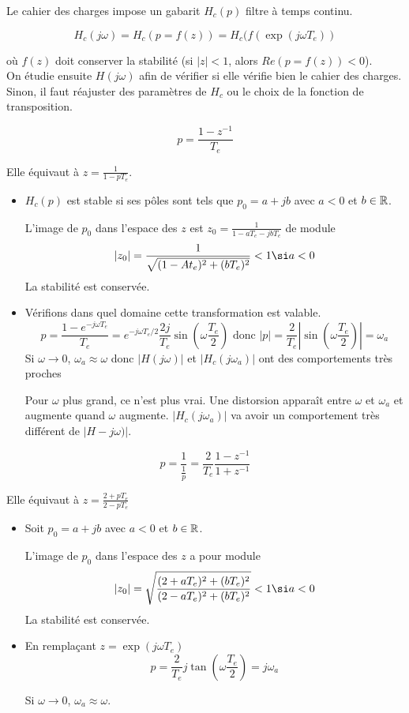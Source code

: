 \documentclass[main.tex]{subfiles}
\begin{document}
Le cahier des charges impose un gabarit $H_c(p)$ filtre à temps continu.

\[H_c(j\omega) = H_c(p=f(z)) = H_c(f(\exp(j\omega T_e))\]

où $f(z)$ doit conserver la stabilité (si $|z| < 1$, alors $Re(p=f(z))<0$).\\

On étudie ensuite $H(j\omega)$ afin de vérifier si elle vérifie bien le cahier des charges. Sinon, il faut réajuster des paramètres de $H_c$ ou le choix de la fonction de transposition.

\begin{exemple} \[p=\frac{1-z^{-1}}{T_e}\]

Elle équivaut à $z = \frac{1}{1-pT_e}$.

\begin{itemize}
\item $H_c(p)$ est stable si ses pôles sont tels que $p_0=a+jb$ avec $a<0$ et $b\in \mathbb{R}$.

L'image de $p_0$ dans l'espace des $z$ est $z_0 = \frac{1}{1-aT_e -jbT_e}$ de module \[|z_0| = \frac{1}{\sqrt{(1-At_e)^2 + (bT_e)^2}} <1 \si a < 0\] La stabilité est conservée.

\item Vérifions dans quel domaine cette transformation est valable.\[ p = \frac{1-e^{-j\omega T_e}}{T_e} = e^{-j\omega T_e/2} \frac{2j}{T_e} \sin(\omega \frac{T_e}{2}) \text{ donc } |p| = \frac{2}{T_e}|\sin(\omega \frac{T_e}{2})| = \omega_a\]
Si $\omega \to 0$, $\omega_a \approx \omega$ donc $|H(j\omega)|$ et $|H_c(j\omega_a)|$ ont des comportements très proches

Pour $\omega$ plus grand, ce n'est plus vrai. Une distorsion apparaît entre $\omega$ et $\omega_a$ et augmente quand $\omega$ augmente. $|H_c(j\omega_a)|$ va avoir un comportement très différent de $|H-j\omega)|$.
\end{itemize}
\end{exemple}

\begin{exemple}
\[p=\frac{1}{\frac{1}{p}}=\frac{2}{T_e} \frac{1-z^{-1}}{1+z^{-1}}\]

Elle équivaut à $z=\frac{2+pT_e}{2-pT_e}$
\begin{itemize}
\item Soit $p_0=a+jb$ avec $a<0$ et $b\in \mathbb{R}$.

L'image de $p_0$ dans l'espace des $z$ a pour module \[ |z_0| = \sqrt{\frac{(2+aT_e)^2+(bT_e)^2}{(2-aT_e)^2+(bT_e)^2}} < 1 \si a < 0\]
La stabilité est conservée.

\item En remplaçant $z=\exp(j\omega T_e)$
\[ p = \frac{2}{T_e} j\tan(\omega \frac{T_e}{2}) = j\omega_a \]

Si $\omega \to 0$, $\omega_a \approx \omega$.

\end{itemize}
\end{exemple}
\end{document}
